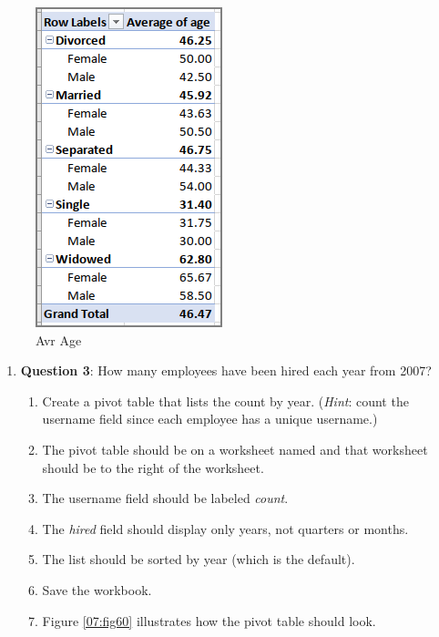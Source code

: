 \begin{figure}[H]
	\centering
	\includegraphics[width=\maxwidth{.95\linewidth}]{gfx/ch07_fig59}
	\caption{Avr Age}
	\label{07:fig59}
\end{figure}

\begin{enumerate}[resume]
	\item{\textbf{Question 3}: How many employees have been hired each year from 2007?}
	
	\begin{enumerate}
		\item Create a pivot table that lists the count by year. (\textit{Hint}: count the username field since each employee has a unique username.)
		\item The pivot table should be on a worksheet named  and that worksheet should be to the right of the  worksheet.
		\item The username field should be labeled \textit{count}. 
		\item The \textit{hired} field should display only years, not quarters or months.
		\item The list should be sorted by year (which is the default).
		\item Save the workbook.
		\item Figure \ref{07:fig60} illustrates how the pivot table should look.
	\end{enumerate}
	
\end{enumerate}

